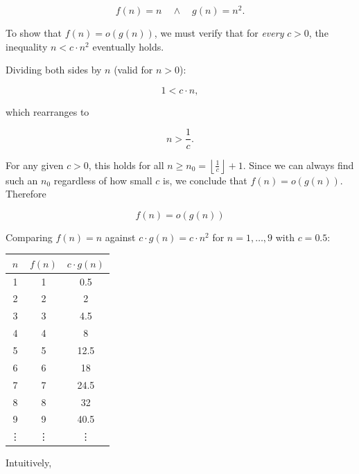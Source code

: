 \documentclass[12pt,a4paper,openany]{article}
\begin{document}
\[
f(n) = n \quad \land \quad g(n) = n^2.
\]

To show that \( f(n) = o(g(n)) \), we must verify that for \emph{every} $c > 0$, the inequality $n < c \cdot n^2$ eventually holds.

Dividing both sides by $n$ (valid for $n > 0$):

\[
1 < c \cdot n,
\]

which rearranges to

\[
n > \frac{1}{c}.
\]

For any given $c > 0$, this holds for all $n \ge n_0 = \left\lfloor \frac{1}{c} \right\rfloor + 1$. Since we can always find such an $n_0$ regardless of how small $c$ is, we conclude that $f(n) = o(g(n))$. Therefore

\[\boxed{f(n) = o(g(n))}\]

Comparing $f(n) = n$ against $c \cdot g(n) = c \cdot n^2$ for $n = 1,\ldots,9$ with $c = 0.5$:

\begin{table}[h]
\centering
\begin{tabular}{|c|c|c|}
\hline
\textbf{$n$} & \textbf{$f(n)$} & \textbf{$c \cdot g(n)$} \\
\hline
1 & 1   & 0.5  \\
2 & 2   & 2    \\
3 & 3   & 4.5  \\
4 & 4   & 8    \\
5 & 5   & 12.5 \\
6 & 6   & 18   \\
7 & 7   & 24.5 \\
8 & 8   & 32   \\
9 & 9   & 40.5 \\
\vdots & \vdots & \vdots \\
\hline
\end{tabular}
\end{table}

\newpage
Intuitively,

\begin{figure}[h]
\centering
{}
\end{figure}
\end{document}
